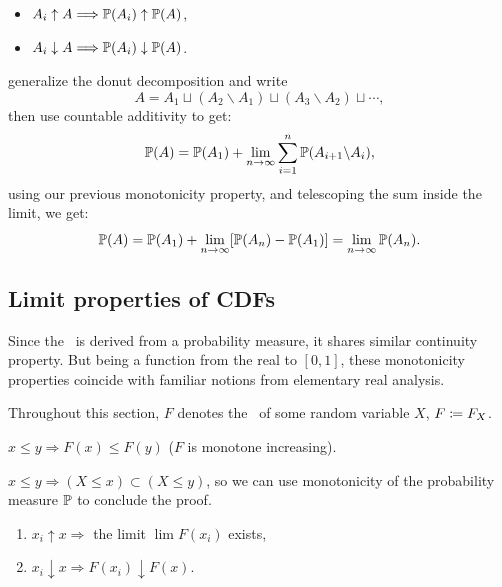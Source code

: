 \documentclass{article}
\begin{document}
\begin{itemize}
  \item $A_i \uparrow A \Longrightarrow \P(A_i) \uparrow \P(A)$,
  \item $A_i \downarrow A \Longrightarrow \P(A_i) \downarrow \P(A)$.
\end{itemize}

 generalize the donut decomposition and write 
\[ A = A_1 \sqcup (A_2 \backslash A_1) \sqcup (A_3 \backslash A_2) \sqcup \cdots, \]
then use countable additivity to get:
\[ \P(A) = \P(A_1) + \lim_{n \to \infty} \sum_{i=1}^n \P(A_{i+1} \backslash A_i), \]
using our previous monotonicity property, and telescoping the sum inside the limit, we get:
\[ \P(A) = \P(A_1) + \lim_{n \to \infty} [\P(A_n) - \P(A_1)] = \lim_{n\to\infty} \P(A_n). \]


\subsection{Limit properties of CDFs}\label{sec:limit-properties-cdfs}

Since the \CDF\ is derived from a probability measure, it shares similar continuity property. But being a function from the real to $[0,1]$, these monotonicity properties coincide with familiar notions from elementary real analysis. 

 Throughout this section, $F$ denotes the \CDF\ of some random variable $X$, $F \defeq F_X$.

 $x \le y \Longrightarrow F(x) \le F(y)$ ($F$ is monotone increasing).

 $x \le y \Longrightarrow (X \le x) \subset (X \le y)$, so we can use monotonicity of the probability measure $\P$ to conclude the proof.

\begin{enumerate}
  \item \label{item:cont1} $x_i \uparrow x \Longrightarrow$ the limit $\lim F(x_i)$ exists,
  \item \label{item:cont2} $x_i \downarrow x \Longrightarrow F(x_i) \downarrow F(x)$.
\end{enumerate}
\end{document}
